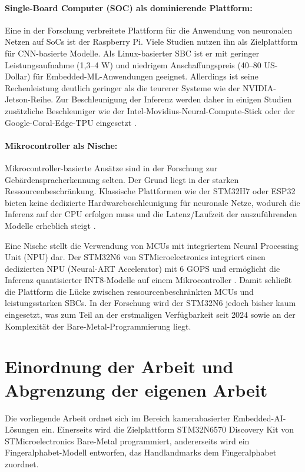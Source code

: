 \paragraph{Single-Board Computer (SOC) als dominierende Plattform:}
Eine in der Forschung verbreitete Plattform für die Anwendung von neuronalen Netzen auf SoCs ist der Raspberry Pi. Viele Studien nutzen ihn als Zielplattform für CNN-basierte Modelle. Als Linux-basierter SBC ist er mit geringer Leistungsaufnahme (1,3–4 W) und niedrigem Anschaffungspreis (40–80 US-Dollar) für Embedded-ML-Anwendungen geeignet. Allerdings ist seine Rechenleistung deutlich geringer als die teurerer Systeme wie der NVIDIA-Jetson-Reihe. Zur Beschleunigung der Inferenz werden daher in einigen Studien zusätzliche Beschleuniger wie der Intel-Movidius-Neural-Compute-Stick oder der Google-Coral-Edge-TPU eingesetzt \cite{biglariReviewEmbeddedMachine2023}.

\paragraph{Mikrocontroller als Nische:}
Mikrocontroller-basierte Ansätze sind in der Forschung zur Gebärdenspracherkennung selten. Der Grund liegt in der starken Ressourcenbeschränkung. Klassische Plattformen wie der STM32H7 oder ESP32 bieten keine dedizierte Hardwarebeschleunigung für neuronale Netze, wodurch die Inferenz auf der CPU erfolgen muss und die Latenz/Laufzeit der auszuführenden Modelle erheblich steigt \cite{abadadeComprehensiveSurveyTinyML2023}.

Eine Nische stellt die Verwendung von MCUs mit integriertem Neural Processing Unit (NPU) dar. Der STM32N6 von STMicroelectronics integriert einen dedizierten NPU (Neural-ART Accelerator) mit 6 GOPS und ermöglicht die Inferenz quantisierter INT8-Modelle auf einem Mikrocontroller \cite{STM32N6570DKProductSTMicroelectronics}. Damit schließt die Plattform die Lücke zwischen ressourcenbeschränkten MCUs und leistungsstarken SBCs. In der Forschung wird der STM32N6 jedoch bisher kaum eingesetzt, was zum Teil an der erstmaligen Verfügbarkeit seit 2024 sowie an der Komplexität der Bare-Metal-Programmierung liegt.

\section{Einordnung der Arbeit und Abgrenzung der eigenen Arbeit}\label{sec:einordnung}
Die vorliegende Arbeit ordnet sich im Bereich kamerabasierter Embedded-AI-Lösungen ein. Einerseits wird die Zielplattform STM32N6570 Discovery Kit von STMicroelectronics Bare-Metal programmiert, andererseits wird ein Fingeralphabet-Modell entworfen, das Handland\-marks dem Fingeralphabet zuordnet.

